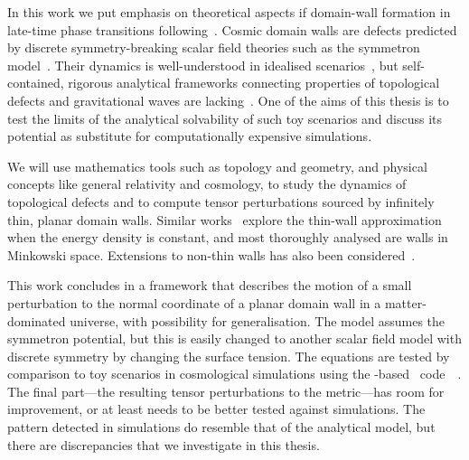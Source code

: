 In this work we put emphasis on theoretical aspects if domain-wall formation in late-time phase transitions following~\citet{christiansenGravitationalWavesDark2024,christiansenAsimulationDomainFormation2024}. Cosmic domain walls are defects predicted by discrete symmetry-breaking scalar field theories such as the symmetron model~\citep{hinterbichlerSymmetronCosmology2011}. Their dynamics is well-understood in idealised scenarios~\citep{vachaspatiKinksDomainWalls2006,blanco-pilladoDynamicsDomainWall2023,guvenPerturbationsTopologicalDefect1993,garrigaPerturbationsDomainWalls1991,ishibashiEquationMotionDomain1999}, but self-contained, rigorous analytical frameworks connecting properties of topological defects and gravitational waves are lacking~\citep{saikawaReviewGravitationalWaves2017}. One of the aims of this thesis is to test the limits of the analytical solvability of such toy scenarios and discuss its potential as substitute for computationally expensive simulations. 














We will use mathematics tools such as topology and geometry, and physical concepts like general relativity and cosmology, to study the dynamics of topological defects and to compute tensor perturbations sourced by infinitely thin, planar domain walls. 
Similar works~\cite{blanco-pilladoDynamicsDomainWall2023,ishibashiEquationMotionDomain1999,garrigaPerturbationsDomainWalls1991} explore the thin-wall approximation when the energy density is constant, and most thoroughly analysed are walls in Minkowski space. Extensions to non-thin walls has also been considered~\citep{cuttingGravitationalWavesVacuum2021}. %


This work concludes in a framework that describes the motion of a small perturbation to the normal coordinate of a planar domain wall in a matter-dominated universe, with possibility for generalisation. The model assumes the symmetron potential, but this is easily changed to another scalar field model with discrete symmetry by changing the surface tension. The equations are tested by comparison to toy scenarios in cosmological simulations using the \gevolution-based~\citep{adamekGeneralRelativityCosmic2016} code~\asgrd~\citep{christiansenGravitationalWavesDark2024}. 
The final part---the resulting tensor perturbations to the metric---has room for improvement, or at least needs to be better tested against simulations. The pattern detected in simulations do resemble that of the analytical model, but there are discrepancies that we investigate in this thesis.



